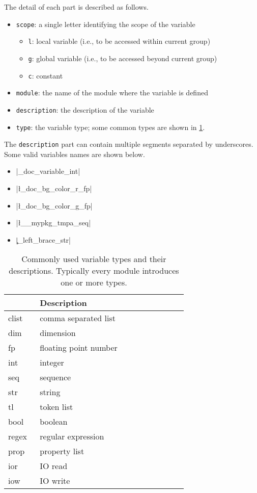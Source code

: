 \documentclass{ltugboat}
\begin{document}
\vspace*{0.5\baselineskip}
\par\noindent The detail of each part is described as follows.
\begin{itemize}
\item \texttt{scope}: a single letter identifying the scope of the variable
\begin{itemize}
\item \texttt{l}: local variable (i.e., to be accessed within current group)
\item \texttt{g}: global variable (i.e., to be accessed beyond current group)
\item \texttt{c}: constant
\end{itemize}
\item \texttt{module}: the name of the module where the variable is defined
\item \texttt{description}: the description of the variable
\item \texttt{type}: the variable type; some common types are shown in \cref{tbl:var-type}.
\end{itemize}
The \texttt{description} part can contain multiple segments separated by underscores. 
Some valid variables names are shown below.
\begin{itemize}
\item \inltex|\g_doc_variable_int|
\item \inltex|\l_doc_bg_color_r_fp|
\item \inltex|\l_doc_bg_color_g_fp|
\item \inltex|\l__mypkg_tmpa_seq|
\item \inltex|\c_left_brace_str|
\end{itemize}


\begin{table}[htpb]
\centering
\begin{tabular}{>{\ttfamily\centering}p{0.15\linewidth}p{0.7\linewidth}}
\toprule
\multicolumn{1}{c}{Type} & Description\\ \midrule
clist & comma separated list\\
dim & dimension\\
fp & floating point number\\
int & integer\\
seq & sequence\\
str & string\\
tl & token list\\
bool & boolean\\
regex & regular expression\\
prop & property list\\
ior & IO read\\
iow & IO write\\ \bottomrule
\end{tabular}
\caption{Commonly used variable types and their descriptions. Typically every \LTT{} module introduces one or more types.}
\label{tbl:var-type}
\end{table}
\end{document}
